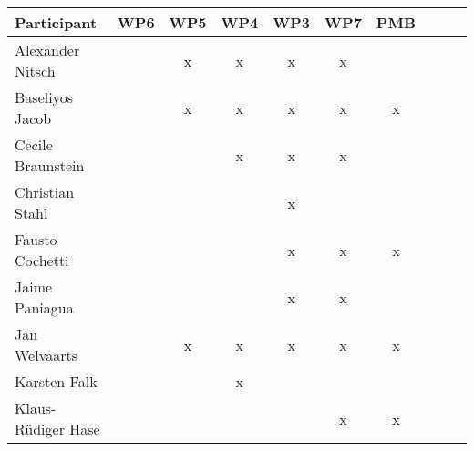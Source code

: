\documentclass[a4paper, 11pt]{article}
\begin{document}
\begin{tabular}{|l|c|c|c||c|c|c||c|c|c|}
\hline
\textbf{Participant} & \textbf{WP6} &  \textbf{WP5} & \textbf{WP4}&  \textbf{WP3} & \textbf{WP7}&  \textbf{PMB} \\\hline
Alexander Nitsch     &  & x & x & x & x &  \\\hline  
Baseliyos Jacob      &  &  x & x & x & x & x  \\\hline 
Cecile Braunstein    &   &   & x & x & x &   \\\hline
Christian Stahl      &   &   &   & x &   &   \\\hline
Fausto Cochetti      &   &   &   & x & x & x  \\\hline
Jaime Paniagua       &   &   &  & x  &  x &   \\\hline
Jan Welvaarts        &   & x & x & x & x  & x  \\\hline
Karsten Falk         &   &   & x &  &   &   \\\hline
Klaus-R\"udiger Hase &  &  &  &  & x & x \\\hline

\end{tabular}
\end{document}
